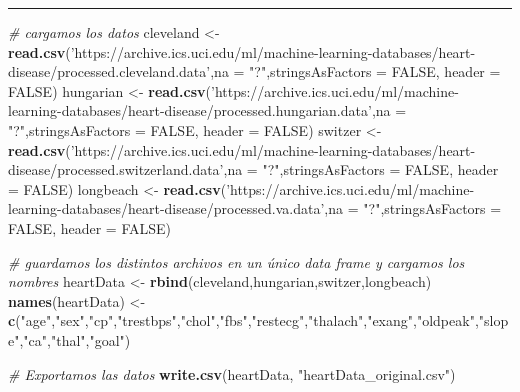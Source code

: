 \documentclass[
]{article}
\newenvironment{Shaded}{\begin{snugshade}}{\end{snugshade}}
\newcommand{\CommentTok}[1]{\textcolor[rgb]{0.56,0.35,0.01}{\textit{#1}}}
\newcommand{\DataTypeTok}[1]{\textcolor[rgb]{0.13,0.29,0.53}{#1}}
\newcommand{\KeywordTok}[1]{\textcolor[rgb]{0.13,0.29,0.53}{\textbf{#1}}}
\newcommand{\NormalTok}[1]{#1}
\newcommand{\OtherTok}[1]{\textcolor[rgb]{0.56,0.35,0.01}{#1}}
\newcommand{\StringTok}[1]{\textcolor[rgb]{0.31,0.60,0.02}{#1}}
\begin{document}
\begin{center}\rule{0.5\linewidth}{0.5pt}\end{center}

\begin{Shaded}
\begin{Highlighting}[]
\CommentTok{# cargamos los datos}
\NormalTok{cleveland <-}\StringTok{ }\KeywordTok{read.csv}\NormalTok{(}\StringTok{'https://archive.ics.uci.edu/ml/machine-learning-databases/heart-disease/processed.cleveland.data'}\NormalTok{,}\DataTypeTok{na =} \StringTok{"?"}\NormalTok{,}\DataTypeTok{stringsAsFactors =} \OtherTok{FALSE}\NormalTok{, }\DataTypeTok{header =} \OtherTok{FALSE}\NormalTok{)}
\NormalTok{hungarian <-}\StringTok{ }\KeywordTok{read.csv}\NormalTok{(}\StringTok{'https://archive.ics.uci.edu/ml/machine-learning-databases/heart-disease/processed.hungarian.data'}\NormalTok{,}\DataTypeTok{na =} \StringTok{"?"}\NormalTok{,}\DataTypeTok{stringsAsFactors =} \OtherTok{FALSE}\NormalTok{, }\DataTypeTok{header =} \OtherTok{FALSE}\NormalTok{)}
\NormalTok{switzer <-}\StringTok{ }\KeywordTok{read.csv}\NormalTok{(}\StringTok{'https://archive.ics.uci.edu/ml/machine-learning-databases/heart-disease/processed.switzerland.data'}\NormalTok{,}\DataTypeTok{na =} \StringTok{"?"}\NormalTok{,}\DataTypeTok{stringsAsFactors =} \OtherTok{FALSE}\NormalTok{, }\DataTypeTok{header =} \OtherTok{FALSE}\NormalTok{)}
\NormalTok{longbeach <-}\StringTok{ }\KeywordTok{read.csv}\NormalTok{(}\StringTok{'https://archive.ics.uci.edu/ml/machine-learning-databases/heart-disease/processed.va.data'}\NormalTok{,}\DataTypeTok{na =} \StringTok{"?"}\NormalTok{,}\DataTypeTok{stringsAsFactors =} \OtherTok{FALSE}\NormalTok{, }\DataTypeTok{header =} \OtherTok{FALSE}\NormalTok{)}

\CommentTok{# guardamos los distintos archivos en un único data frame y cargamos los nombres}
\NormalTok{heartData <-}\StringTok{ }\KeywordTok{rbind}\NormalTok{(cleveland,hungarian,switzer,longbeach)}
\KeywordTok{names}\NormalTok{(heartData) <-}\StringTok{ }\KeywordTok{c}\NormalTok{(}\StringTok{"age"}\NormalTok{,}\StringTok{"sex"}\NormalTok{,}\StringTok{"cp"}\NormalTok{,}\StringTok{"trestbps"}\NormalTok{,}\StringTok{"chol"}\NormalTok{,}\StringTok{"fbs"}\NormalTok{,}\StringTok{"restecg"}\NormalTok{,}\StringTok{"thalach"}\NormalTok{,}\StringTok{"exang"}\NormalTok{,}\StringTok{"oldpeak"}\NormalTok{,}\StringTok{"slope"}\NormalTok{,}\StringTok{"ca"}\NormalTok{,}\StringTok{"thal"}\NormalTok{,}\StringTok{"goal"}\NormalTok{)}

\CommentTok{# Exportamos las datos }
\KeywordTok{write.csv}\NormalTok{(heartData, }\StringTok{"heartData_original.csv"}\NormalTok{)}


\end{Highlighting}
\end{Shaded}
\end{document}
